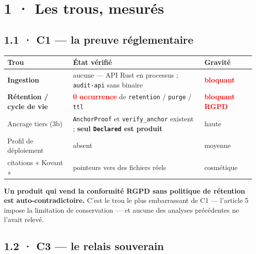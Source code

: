 \documentclass[10pt]{article}
\newcommand{\pire}[1]{\textcolor{red}{\textbf{#1}}}
\newcommand{\code}[1]{\texttt{\small #1}}
\begin{document}
\section{1 · Les trous, mesurés}

\subsection{1.1 · C1 --- la preuve réglementaire}

\renewcommand{\arraystretch}{1.22}
\begin{center}\small
\begin{tabular}{@{}>{\raggedright\arraybackslash}p{3.9cm} >{\raggedright\arraybackslash}p{8.6cm} >{\centering\arraybackslash}p{2.7cm}@{}}
\toprule
\textbf{Trou} & \textbf{État vérifié} & \textbf{Gravité} \\
\midrule
\textbf{Ingestion} & aucune --- API Rust en processus ; \code{audit-api} sans binaire & \pire{bloquant} \\
\textbf{Rétention / cycle de vie} & \pire{0 occurrence} de \code{retention} / \code{purge} / \code{ttl} & \pire{bloquant RGPD} \\
Ancrage tiers (3b) & \code{AnchorProof} et \code{verify\_anchor} existent ; \textbf{seul \code{Declared} est produit} & haute \\
Profil de déploiement & absent & moyenne \\
3 citations « Kovant » & pointeurs vers des fichiers réels & cosmétique \\
\bottomrule
\end{tabular}
\end{center}

\begin{alerte}
\textbf{Un produit qui vend la conformité RGPD sans politique de rétention est auto-contradictoire.}
C'est le trou le plus embarrassant de C1 --- l'article 5 impose la limitation de conservation --- et
aucune des analyses précédentes ne l'avait relevé.
\end{alerte}

\subsection{1.2 · C3 --- le relais souverain}
\end{document}
